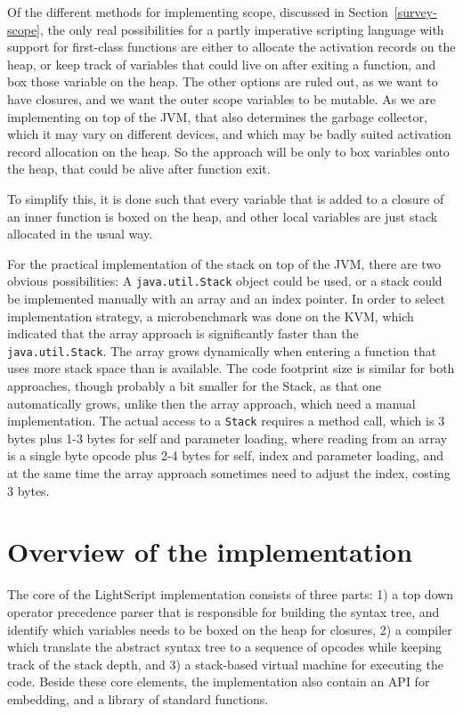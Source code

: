 \documentclass[11pt]{report}
\begin{document}
Of the different methods for implementing scope, discussed in Section~\ref{survey-scope}, the only real possibilities for a partly imperative scripting language with support for first-class functions are either to allocate the activation records on the heap, or keep track of variables that could live on after exiting a function, and box those variable on the heap.
The other options are ruled out, as we want to have closures, and we want the outer scope variables to be mutable.
As we are implementing on top of the JVM, that also determines the garbage collector, which it may vary on different devices, and which may be badly suited activation record allocation on the heap.
So the approach will be only to box variables onto the heap, that could be alive after function exit.

To simplify this, it is done such that every variable that is added to a closure of an inner function is boxed on the heap, and other local variables are just stack allocated in the usual way. 

For the practical implementation of the stack on top of the JVM, there are two obvious possibilities: A \verb|java.util.Stack| object could be used, or a stack could be implemented manually with an array and an index pointer. 
In order to select implementation strategy, a microbenchmark was done on the KVM, which indicated that the array approach is significantly faster than the \verb|java.util.Stack|. The array grows dynamically when entering a function that uses more stack space than is available. 
The code footprint size is similar for both approaches, though probably a bit smaller for the Stack, as that one automatically grows, unlike then the array approach, which need a manual implementation.
The actual access to a \verb|Stack| requires a method call, which is 3 bytes plus 1-3 bytes for self and parameter loading, where reading from an array is a single byte opcode plus 2-4 bytes for self, index and parameter loading, and at the same time the array approach sometimes need to adjust the index, costing 3 bytes.

\section{Overview of the implementation}
The core of the LightScript implementation consists of three parts: 1) a top down operator precedence parser that is responsible for building the syntax tree, and identify which variables needs to be boxed on the heap for closures, 2) a compiler which translate the abstract syntax tree to a sequence of opcodes while keeping track of the stack depth, and 3) a stack-based virtual machine for executing the code.
Beside these core elements, the implementation also contain an API for embedding, and a library of standard functions.
\end{document}
